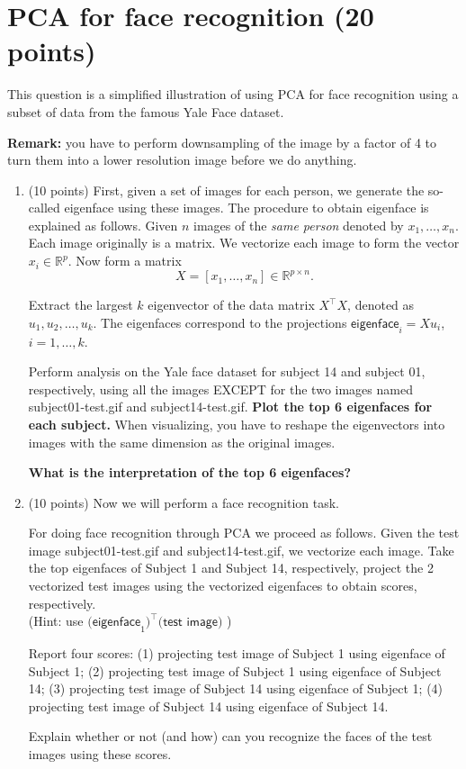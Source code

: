 \documentclass[a4paper,12pt,fleqn]{article}
\begin{document}
\section{PCA for face recognition (20 points)}

This question is a simplified illustration of using PCA for face recognition using a subset of data from the famous Yale Face dataset. 

 {\bf Remark:} you have to perform downsampling of the image by a factor of 4 to turn them into a lower resolution image before we do anything. 


\begin{enumerate}
\item 
(10 points) 
First, given a set of images for each person, we generate the so-called eigenface using these images. The procedure to obtain eigenface is explained as follows. 
%
Given $n$ images of the {\it same person} denoted by $x_1, \ldots, x_n$. Each image originally is a matrix. We vectorize each image to form the vector $x_i \in \mathbb R^p$. Now form a matrix
\[
X = [x_1, \ldots, x_n] \in \mathbb R^{p\times n}.
\]

Extract the largest $k$ eigenvector of the data matrix $X^\top X$, denoted as $u_1, u_2,  \ldots, u_k$. The eigenfaces correspond to the projections $\textsf{eigenface}_i = X u_i$, $i = 1, \ldots, k$.

Perform analysis on the Yale face dataset for subject 14 and subject 01, respectively, using all the images EXCEPT for the two images named \textsf{subject01-test.gif} and \textsf{subject14-test.gif}. {\bf Plot the top 6 eigenfaces for each subject.} When visualizing, you have to reshape the eigenvectors into images with the same dimension as the original images. 

{\bf What is the interpretation of the top 6 eigenfaces?}

\item (10 points) Now we will perform a face recognition task. 

For doing face recognition through PCA we proceed as follows. Given the test image \textsf{subject01-test.gif} and \textsf{subject14-test.gif}, we vectorize each image. Take the top eigenfaces of Subject 1 and Subject 14, respectively, project the 2 vectorized test images using the vectorized eigenfaces to obtain scores, respectively. \\(Hint: use $\textsf{(eigenface}_1)^\top \textsf{(test image)}$ )

Report four scores: (1) projecting test image of Subject 1 using eigenface of Subject 1; (2) projecting test image of Subject 1 using eigenface of Subject 14; (3) projecting test image of Subject 14 using eigenface of Subject 1; (4) projecting test image of Subject 14 using eigenface of Subject 14. 

Explain whether or not (and how) can you recognize the faces of the test images using these scores. 


\end{enumerate}
\end{document}
